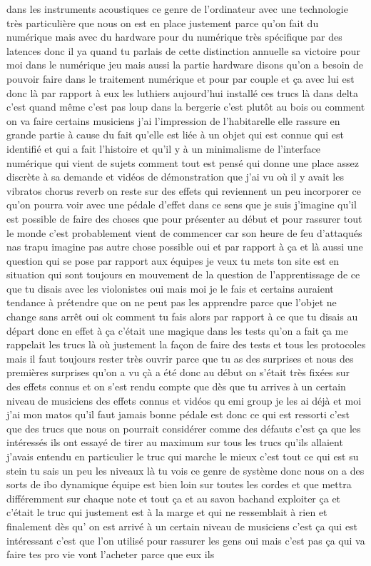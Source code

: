  dans les instruments acoustiques ce genre de l'ordinateur avec une technologie très particulière que nous on est en place justement parce qu'on fait du numérique mais avec du hardware pour du numérique très spécifique par des latences donc il ya quand tu parlais de cette distinction annuelle sa victoire pour moi dans le numérique jeu mais aussi la partie hardware disons qu'on a besoin de pouvoir faire dans le traitement numérique et pour par couple et ça avec lui est donc là par rapport à eux les luthiers aujourd'hui installé ces trucs là dans delta c'est quand même c'est pas loup dans la bergerie c'est plutôt au bois ou comment on va faire certains musiciens j'ai l'impression de l'habitarelle elle rassure en grande partie à cause du fait qu'elle est liée à un objet qui est connue qui est identifié et qui a fait l'histoire et qu'il y à un minimalisme de l'interface numérique qui vient de sujets comment tout est pensé qui donne une place assez discrète à sa demande et vidéos de démonstration que j'ai vu où il y avait les vibratos chorus reverb on reste sur des effets qui reviennent un peu incorporer ce qu'on pourra voir avec une pédale d'effet dans ce sens que je suis j'imagine qu'il est possible de faire des choses que pour présenter au début et pour rassurer tout le monde c'est probablement vient de commencer car son heure de feu d'attaqués nas trapu imagine pas autre chose possible oui et par rapport à ça et là aussi une question qui se pose par rapport aux équipes je veux tu mets ton site est en situation qui sont 
 toujours en mouvement de la question de l'apprentissage de ce que tu disais avec les violonistes oui mais moi je le fais et certains auraient tendance à prétendre que on ne peut pas les apprendre parce que l'objet ne change sans arrêt oui ok comment tu fais alors par rapport à ce que tu disais au départ donc en effet à ça c'était une magique dans les tests qu'on a fait ça me rappelait les trucs là où justement la façon de faire des tests et tous les protocoles mais il faut toujours rester très ouvrir parce que tu as des surprises et nous des premières surprises qu'on a vu çà a été donc au début on s'était très fixées sur des effets connus et on s'est rendu compte que dès que tu arrives à un certain niveau de musiciens des effets connus et vidéos qu emi group je les ai déjà et moi j'ai mon matos qu'il faut jamais bonne pédale est donc ce qui est ressorti c'est que des trucs que nous on pourrait considérer comme des défauts c'est ça que les intéressés ils ont essayé de tirer au maximum sur tous les trucs qu'ils allaient j'avais entendu en particulier le truc qui marche le mieux c'est tout ce qui est su stein tu sais un peu les niveaux là tu vois ce genre de système donc nous on a des sorts de ibo dynamique équipe est bien loin sur toutes les cordes et que mettra différemment sur chaque note et tout ça et au savon bachand exploiter ça et c'était le truc qui justement est à la marge et qui ne ressemblait à rien et finalement dès qu' on est arrivé à un certain niveau de musiciens c'est ça qui est intéressant c'est que l'on utilisé pour rassurer les gens oui mais c'est pas ça qui va faire tes pro vie vont l'acheter parce que eux ils 
